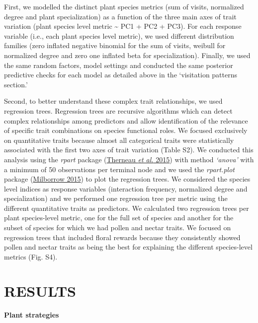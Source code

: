 \documentclass[
  12pt,
  a4paper,
]{article}
\begin{document}
First, we modelled the distinct plant species metrics (sum of visits, normalized degree and plant specialization) as a function of the three main axes of trait variation (plant species level metric \textasciitilde{} PC1 + PC2 + PC3). For each response variable (i.e., each plant species level metric), we used different distribution families (zero inflated negative binomial for the sum of visits, weibull for normalized degree and zero one inflated beta for specialization). Finally, we used the same random factors, model settings and conducted the same posterior predictive checks for each model as detailed above in the `visitation patterns section.'

Second, to better understand these complex trait relationships, we used regression trees. Regression trees are recursive algorithms which can detect complex relationships among predictors and allow identification of the relevance of specific trait combinations on species functional roles. We focused exclusively on quantitative traits because almost all categorical traits were statistically associated with the first two axes of trait variation (Table S2). We conducted this analysis using the \emph{rpart} package (\protect\hyperlink{ref-therneau2015}{Therneau \emph{et al.} 2015}) with method \emph{`anova'} with a minimum of 50 observations per terminal node and we used the \emph{rpart.plot} package (\protect\hyperlink{ref-milborrow2015}{Milborrow 2015}) to plot the regression trees. We considered the species level indices as response variables (interaction frequency, normalized degree and specialization) and we performed one regression tree per metric using the different quantitative traits as predictors. We calculated two regression trees per plant species-level metric, one for the full set of species and another for the subset of species for which we had pollen and nectar traits. We focused on regression trees that included floral rewards because they consistently showed pollen and nectar traits as being the best for explaining the different species-level metrics (Fig. S4).

\hypertarget{results}{%
\section{RESULTS}\label{results}}

\textbf{Plant strategies}
\end{document}
